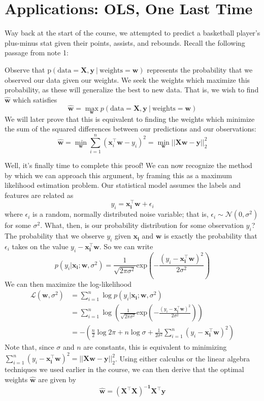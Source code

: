 \documentclass{article}
\begin{document}
\clearpage
\section*{Applications: OLS, One Last Time}
Way back at the start of the course, we attempted to predict a basketball player's plus-minus stat given their points, assists, and rebounds. Recall the following passage from note 1:
\begin{displayquote}
Observe that $\text{p}(\text{data} = \mathbf{X}, \mathbf{y}\ |\ \text{weights} = \mathbf{w})$ represents the probability that we observed our data given our weights. We seek the weights which maximize this probability, as these will generalize the best to new data. That is, we wish to find $\hat{\mathbf{w}}$ which satisfies $$\hat{\mathbf{w}} = \max\limits_{\mathbf{w}} p(\text{data} = \mathbf{X}, \mathbf{y}\ |\ \text{weights} = \mathbf{w})$$ We will later prove that this is equivalent to finding the weights which minimize the sum of the squared differences between our predictions and our observations: $$\hat{\mathbf{w}} = \min\limits_{\mathbf{w}} \sum\limits_{i=1}^{n} (\mathbf{x}_i^{\top}\mathbf{w} - y_i)^2 = \min\limits_{\mathbf{w}}||\mathbf{X}\mathbf{w} - \mathbf{y}||_2^2$$ 
\end{displayquote}
Well, it's finally time to complete this proof! We can now recognize the method by which we can approach this argument, by framing this as a maximum likelihood estimation problem. Our statistical model assumes the labels and features are related as $$y_i = \mathbf{x_i^\top w} + \epsilon_i$$ where $\epsilon_i$ is a random, normally distributed noise variable; that is, $\epsilon_i \sim \mathcal{N}(0, \sigma^2)$ for some $\sigma^2$. What, then, is our probability distribution for some observation $y_i$? The probability that we observe $y_i$ given $\mathbf{x_i}$ and $\mathbf{w}$ is exactly the probability that $\epsilon_i$ takes on the value $y_i - \mathbf{x_i^\top w}$. So we can write $$p(y_i|\mathbf{x_i};\mathbf{w},\sigma^2) = \frac{1}{\sqrt{2\pi\sigma^2}}\text{exp}(-\frac{(y_i-\mathbf{x_i^\top w})^2}{2\sigma^2})$$
We can then maximize the log-likelihood
\begin{align*}
\mathcal{L}(\mathbf{w}, \sigma^2) &= \sum_{i=1}^n \log p(y_i|\mathbf{x_i};\mathbf{w},\sigma^2) \\
&= \sum_{i=1}^n \log(\frac{1}{\sqrt{2\pi\sigma^2}}\text{exp}(-\frac{(y_i-\mathbf{x_i^\top w})^2}{2\sigma^2})) \\
&= -(\frac{n}{2}\log 2\pi + n\log\sigma + \frac{1}{2\sigma^2}\sum_{i=1}^n (y_i - \mathbf{x_i^\top w})^2)
\end{align*}
Note that, since $\sigma$ and $n$ are constants, this is equivalent to minimizing $\sum_{i=1}^n (y_i - \mathbf{x_i^\top w})^2 = ||\mathbf{Xw - y}||_2^2$. Using either calculus or the linear algebra techniques we used earlier in the course, we can then derive that the optimal weights $\hat{\mathbf{w}}$ are given by $$\hat{\mathbf{w}} = \mathbf{(X^\top X)^{-1}X^\top y}$$
\end{document}
